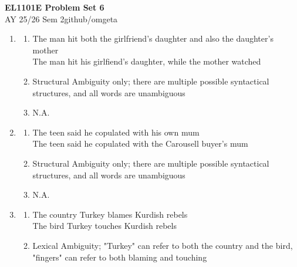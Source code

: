 \documentclass[12pt, a4paper]{article}
\newcommand{\mytitle}{EL1101E Problem Set 6}
\newcommand{\myauthor}{github/omgeta}
\newcommand{\mydate}{AY 25/26 Sem 2}
\begin{document}
\raggedright
\footnotesize
\begin{center}
{\normalsize{\textbf{\mytitle}}} \\
{\footnotesize{\mydate\hspace{2pt}\textemdash\hspace{2pt}\myauthor}}
\end{center}
\begin{enumerate}
  \item 
    \begin{enumerate}
      \item The man hit both the girlfriend's daughter and also the daughter's mother\\ 
        The man hit his girlfiend's daughter, while the mother watched

      \item Structural Ambiguity only; there are multiple possible syntactical structures, and all words are unambiguous 

      \item N.A.
    \end{enumerate}

  \item 
    \begin{enumerate}
      \item The teen said he copulated with his own mum\\ 
        The teen said he copulated with the Carousell buyer's mum 

      \item Structural Ambiguity only; there are multiple possible syntactical structures, and all words are unambiguous 

      \item N.A.
    \end{enumerate}

  \item 
    \begin{enumerate}
      \item The country Turkey blames Kurdish rebels\\ 
        The bird Turkey touches Kurdish rebels 

      \item Lexical Ambiguity; "Turkey" can refer to both the country and the bird, "fingers" can refer to both blaming and touching 


\end{enumerate}
\end{enumerate}
\end{document}
